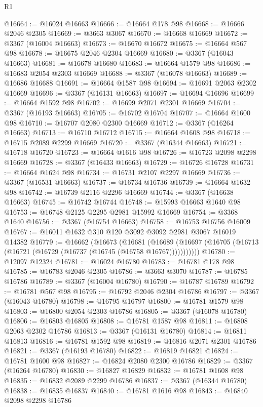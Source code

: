 \begin{lexlean}{R1}
\begin{coremodule}
@16664 := @16024 @16663
@16666 := @16664 @178 @98
@16668 := @16666 @2046 @2305
@16669 := @3663 @3067
@16670 := @16668 @16669
@16672 := @3367 (@16004 @16663)
@16673 := @16670 @16672
@16675 := @16664 @567 @98
@16678 := @16675 @2046 @2304 @16669
@16680 := @3367 (@16043 @16663)
@16681 := @16678 @16680
@16683 := @16664 @1579 @98
@16686 := @16683 @2054 @2303 @16669
@16688 := @3367 (@16078 @16663)
@16689 := @16686 @16688
@16691 := @16664 @1587 @98
@16694 := @16691 @2063 @2302 @16669
@16696 := @3367 (@16131 @16663)
@16697 := @16694 @16696
@16699 := @16664 @1592 @98
@16702 := @16699 @2071 @2301 @16669
@16704 := @3367 (@16193 @16663)
@16705 := @16702 @16704
@16707 := @16664 @1600 @98
@16710 := @16707 @2080 @2300 @16669
@16712 := @3367 (@16264 @16663)
@16713 := @16710 @16712
@16715 := @16664 @1608 @98
@16718 := @16715 @2089 @2299 @16669
@16720 := @3367 (@16344 @16663)
@16721 := @16718 @16720
@16723 := @16664 @1616 @98
@16726 := @16723 @2098 @2298 @16669
@16728 := @3367 (@16433 @16663)
@16729 := @16726 @16728
@16731 := @16664 @1624 @98
@16734 := @16731 @2107 @2297 @16669
@16736 := @3367 (@16531 @16663)
@16737 := @16734 @16736
@16739 := @16664 @1632 @98
@16742 := @16739 @2116 @2296 @16669
@16744 := @3367 (@16638 @16663)
@16745 := @16742 @16744
@16748 := @15993 @16663 @1640 @98
@16753 := @16748 @2125 @2295 @2981 @15992 @16669
@16754 := @3368 @1640
@16756 := @3367 (@16754 @16663)
@16758 := @16753 @16756 @16009
@16767 := @16011 @1632 @310 @120 @3092 @3092 @2981 @3067 @16019 @14382
@16779 := @16662
    (@16673
      (@16681
        (@16689 (@16697 (@16705 (@16713 (@16721 (@16729 (@16737 (@16745 (@16758 @16767)))))))))))
@16780 := @12097 @12324
@16781 := @16024 @16780
@16783 := @16781 @178 @98
@16785 := @16783 @2046 @2305
@16786 := @3663 @3070
@16787 := @16785 @16786
@16789 := @3367 (@16004 @16780)
@16790 := @16787 @16789
@16792 := @16781 @567 @98
@16795 := @16792 @2046 @2304 @16786
@16797 := @3367 (@16043 @16780)
@16798 := @16795 @16797
@16800 := @16781 @1579 @98
@16803 := @16800 @2054 @2303 @16786
@16805 := @3367 (@16078 @16780)
@16806 := @16803 @16805
@16808 := @16781 @1587 @98
@16811 := @16808 @2063 @2302 @16786
@16813 := @3367 (@16131 @16780)
@16814 := @16811 @16813
@16816 := @16781 @1592 @98
@16819 := @16816 @2071 @2301 @16786
@16821 := @3367 (@16193 @16780)
@16822 := @16819 @16821
@16824 := @16781 @1600 @98
@16827 := @16824 @2080 @2300 @16786
@16829 := @3367 (@16264 @16780)
@16830 := @16827 @16829
@16832 := @16781 @1608 @98
@16835 := @16832 @2089 @2299 @16786
@16837 := @3367 (@16344 @16780)
@16838 := @16835 @16837
@16840 := @16781 @1616 @98
@16843 := @16840 @2098 @2298 @16786

\end{coremodule}
\end{lexlean}
